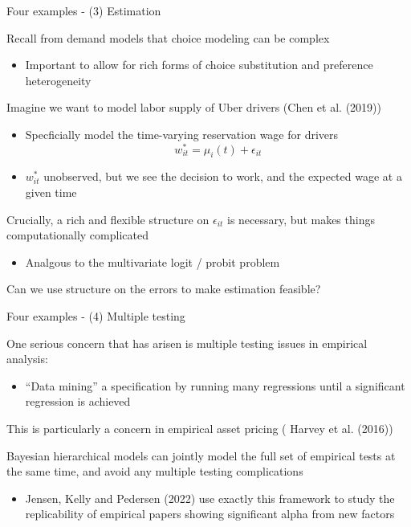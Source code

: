 \documentclass[notes,11pt, aspectratio=169]{beamer}
\newenvironment{wideitemize}{\itemize\addtolength{\itemsep}{10pt}}{\enditemize}
\begin{document}
\begin{frame}{Four examples - (3) Estimation}
  \begin{wideitemize}
  \item Recall from demand models that choice modeling can be complex
    \begin{itemize}
    \item Important to allow for rich forms of choice substitution and
      preference heterogeneity
    \end{itemize}
  \item Imagine we want to model labor supply of Uber drivers (Chen et al. (2019))
    \begin{itemize}
    \item Specficially model the time-varying reservation wage for drivers
      $$w_{it}^{*} = \mu_{i}(t) + \epsilon_{it}$$
    \item $w_{it}^{*}$ unobserved, but we see the decision to work,
      and the expected wage at a given time
    \end{itemize}
  \item Crucially, a rich and flexible structure on $\epsilon_{it}$ is necessary, but makes things computationally complicated
    \begin{itemize}
    \item Analgous to the multivariate logit / probit problem
    \end{itemize}
  \item Can we use structure on the errors to make estimation feasible?
  \end{wideitemize}
\end{frame}

\begin{frame}{Four examples - (4) Multiple testing}
  \begin{wideitemize}
  \item One serious concern that has arisen is multiple testing issues in empirical analysis:
    \begin{itemize}
    \item ``Data mining'' a specification by running many regressions until a significant regression is achieved
    \end{itemize}
  \item This is particularly a concern in empirical asset pricing ( Harvey et al. (2016))
  \item Bayesian hierarchical models can jointly model the full set of
    empirical tests at the same time, and avoid any multiple testing
    complications 
    \begin{itemize}
    \item Jensen, Kelly and Pedersen (2022) use exactly this framework
      to study the replicability of empirical papers showing significant alpha from new factors 
    \end{itemize}
  \end{wideitemize}
\end{frame}
\end{document}
